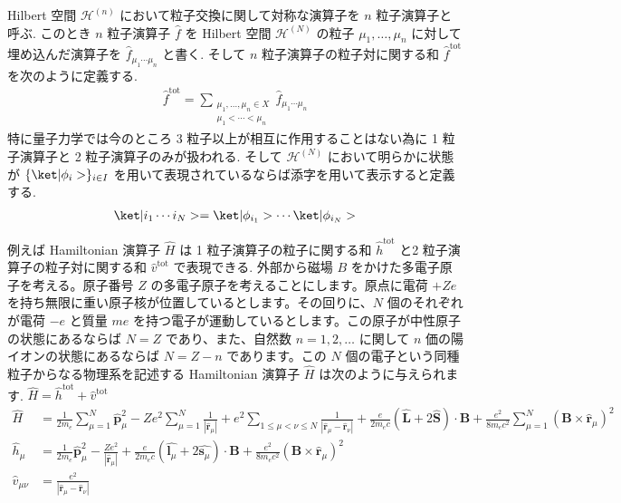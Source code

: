 \documentclass[uplatex,dvipdfmx,a4paper,11pt]{jlreq}
\newcommand{\HH}{\mathcal{H}}
\newcommand{\rr}{\bm{r}}
\newcommand{\pp}{\bm{p}}
\numberwithin{equation}{section}
\theoremstyle{definition}
\begin{document}
\begin{definition}[$n$ 粒子演算子]
  Hilbert 空間 $\HH^{(n)}$ において粒子交換に関して対称な演算子を $n$ 粒子演算子と呼ぶ.
  このとき $n$ 粒子演算子 $\hat{f}$ を Hilbert 空間 $\HH^{(N)}$ の粒子 $\mu_1,\ldots,\mu_n$ に対して埋め込んだ演算子を $\hat{f}_{\mu_1\cdots\mu_n}$ と書く.
  そして $n$ 粒子演算子の粒子対に関する和 $\hat{f}^{\mathrm{tot}}$ を次のように定義する.
  \begin{align}
    \hat{f}^{\mathrm{tot}} = \sum_{\substack{\mu_1,\ldots,\mu_n\in X \\ \mu_1 < \cdots < \mu_n}}\hat{f}_{\mu_1\cdots\mu_n}
  \end{align}
  特に量子力学では今のところ 3 粒子以上が相互に作用することはない為に 1 粒子演算子と 2 粒子演算子のみが扱われる.
  そして $\HH^{(N)}$ において明らかに状態が $\{\ket|\phi_i>\}_{i\in I}$ を用いて表現されているならば添字を用いて表示すると定義する.
  \begin{align}
    \ket|i_1\cdots i_N> = \ket|\phi_{i_1}>\cdots\ket|\phi_{i_N}>
  \end{align}
\end{definition}
\begin{example}
  例えば Hamiltonian 演算子 $\hat{H}$ は 1 粒子演算子の粒子に関する和 $\hat{h}^{\mathrm{tot}}$ と2 粒子演算子の粒子対に関する和 $\hat{v}^{\mathrm{tot}}$ で表現できる.
  外部から磁場 $B$ をかけた多電子原子を考える。原子番号 $Z$ の多電子原子を考えることにします。原点に電荷 $+Ze$ を持ち無限に重い原子核が位置しているとします。その回りに、$N$ 個のそれぞれが電荷 $-e$ と質量 $me$ を持つ電子が運動しているとします。この原子が中性原子の状態にあるならば $N = Z$ であり、また、自然数 $n = 1, 2,\ldots$ に関して $n$ 価の陽イオンの状態にあるならば $N = Z - n$ であります。この $N$ 個の電子という同種粒子からなる物理系を記述する Hamiltonian 演算子 $\hat{H}$ は次のように与えられます.
  $\hat{H} = \hat{h}^{\mathrm{tot}} + \hat{v}^{\mathrm{tot}}$
  \begin{align}
    \hat{H}          & = \frac{1}{2m_e}\sum_{\mu=1}^{N}\hat{\pp}_\mu^2 - Ze^2\sum_{\mu=1}^{N}\frac{1}{|\hat{\rr}_\mu|} + e^2\sum_{1\leq\mu<\nu\leq N}\frac{1}{|\hat{\rr}_\mu - \hat{\rr}_\nu|} + \frac{e}{2m_ec}(\hat{\bm{L}} + 2\hat{\bm{S}})\cdot\bm{B} + \frac{e^2}{8m_ec^2}\sum_{\mu=1}^{N}(\bm{B}\times\hat{\rr}_\mu)^2 \\
    \hat{h}_\mu      & = \frac{1}{2m_e}\hat{\pp}_\mu^2 - \frac{Ze^2}{|\hat{\rr}_\mu|} + \frac{e}{2m_ec}(\hat{\bm{l}_\mu} + 2\hat{\bm{s}_\mu})\cdot\bm{B} + \frac{e^2}{8m_ec^2}(\bm{B}\times\hat{\rr}_\mu)^2                                                                                                                  \\
    \hat{v}_{\mu\nu} & = \frac{e^2}{|\hat{\rr}_\mu - \hat{\rr}_\nu|}
  \end{align}
\end{example}
\end{document}
